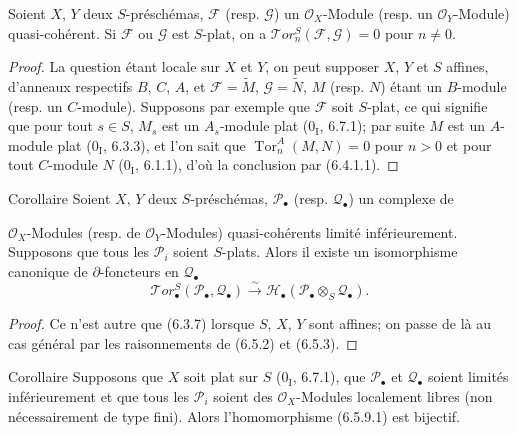\begin{proposition}[6.5.8]
Soient $X$, $Y$ deux $S$-préschémas, $\mathscr F$ (resp. $\mathscr G$) un
$\mathscr O_X$-Module (resp. un $\mathscr O_Y$-Module) quasi-cohérent. Si
$\mathscr F$ ou $\mathscr G$ est $S$-plat, on a
$\mathscr{T}\!or_n^S(\mathscr F,\mathscr G)=0$ pour $n\neq0$.
\end{proposition}

\begin{proof}
La question étant locale sur $X$ et $Y$, on peut supposer $X$, $Y$ et $S$
affines, d'anneaux respectifs $B$, $C$, $A$, et
$\mathscr F=\widetilde M$, $\mathscr G=\widetilde N$, $M$ (resp. $N$) étant
un $B$-module (resp. un $C$-module). Supposons par exemple que $\mathscr F$
soit $S$-plat, ce qui signifie que pour tout $s\in S$, $M_s$ est un
$A_s$-module plat ($0_{\mathrm I}$, 6.7.1); par suite $M$ est un $A$-module plat
($0_{\mathrm I}$, 6.3.3), et l'on sait que
$\operatorname{Tor}_n^A(M,N)=0$ pour $n>0$ et pour tout $C$-module $N$
($0_{\mathrm I}$, 6.1.1), d'où la conclusion par (6.4.1.1).
\end{proof}

\begin{namedtheorem}[6.5.9]{Corollaire}
Soient $X$, $Y$ deux $S$-préschémas, $\mathscr P_\bullet$ (resp.
$\mathscr Q_\bullet$) un complexe de

$\mathscr O_X$-Modules (resp. de $\mathscr O_Y$-Modules) quasi-cohérents limité
inférieurement. Supposons que tous les $\mathscr P_i$ soient $S$-plats. Alors
il existe un isomorphisme canonique de $\partial$-foncteurs en
$\mathscr Q_\bullet$
\[
  \mathscr{T}\!or_\bullet^S(\mathscr P_\bullet,\mathscr Q_\bullet)
  \xrightarrow{\sim}
  \mathscr H_\bullet(\mathscr P_\bullet\otimes_S\mathscr Q_\bullet).
  \tag{6.5.9.1}\label{III.6.5.9.1.fr}
\]
\end{namedtheorem}

\begin{proof}
Ce n'est autre que (6.3.7) lorsque $S$, $X$, $Y$ sont affines; on passe de là
au cas général par les raisonnements de (6.5.2) et (6.5.3).
\end{proof}

\begin{namedtheorem}[6.5.10]{Corollaire}
Supposons que $X$ soit plat sur $S$ ($0_{\mathrm I}$, 6.7.1), que
$\mathscr P_\bullet$ et $\mathscr Q_\bullet$ soient limités inférieurement et
que tous les $\mathscr P_i$ soient des $\mathscr O_X$-Modules localement
libres (non nécessairement de type fini). Alors l'homomorphisme (6.5.9.1) est
bijectif.
\end{namedtheorem}

